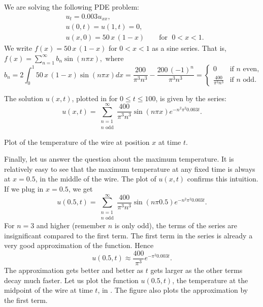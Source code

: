 \documentclass{ximera}
\begin{document}
\begin{exampleSol}
    We are solving the following PDE problem:
    \begin{align*}
        & u_t = 0.003 u_{xx} , \\
        & u(0,t) = u(1,t) = 0 , \\
        & u(x,0) = 50\,x\,(1-x) \qquad \text{for } \; 0 < x < 1 .
    \end{align*}
    We write $f(x) = 50\,x\,(1-x)$ for $0 < x < 1$ as a sine series.  That is, $f(x) = \sum_{n=1}^\infty b_n \sin (n \pi x) ,$ where
    \begin{equation*}
        b_n = 2 \int_0^1 50\,x\,(1-x) \sin (n \pi x)dx =  \frac{200}{{\pi }^{3}{n}^{3}}-\frac{200\,{\left( -1\right) }^{n}}{{\pi }^{3}{n}^{3}} =
        \begin{cases}
            0 & \text{if } n \text{ even} , \\
            \frac{400}{\pi^3 n^3} & \text{if } n \text{ odd} .
        \end{cases}
    \end{equation*}
    
    The solution $u(x,t)$, plotted in  for $0 \leq t \leq 100$, is given by the series:
    \begin{equation*}
        u(x,t) = \sum_{\substack{n=1 \\ 
        n \text{ odd}}}^\infty \frac{400}{\pi^3 n^3} \sin (n \pi x ) e^{-n^2 \pi^2 0.003 t} .
    \end{equation*}
    
    \begin{myfig}
        \capstart
        \caption{Plot of the temperature of the wire at position $x$ at time $t$.\label{heat:wireexfig}}
    \end{myfig}
    
    Finally, let us answer the question about the maximum temperature.  It is relatively easy to see that the maximum temperature at any fixed time is always at $x=0.5$, in the middle of the wire.  The plot of $u(x,t)$ confirms this intuition. If we plug in $x=0.5$, we get
    \begin{equation*}
        u(0.5,t) = \sum_{\substack{n=1 \\ 
        n \text{ odd}}}^\infty \frac{400}{\pi^3 n^3} \sin (n \pi0.5 ) e^{-n^2 \pi^2 0.003 t} .
    \end{equation*}
    For $n=3$ and higher (remember $n$ is only odd), the terms of the series are insignificant compared to the first term. The first term in the series is already a very good approximation of the function. Hence 
    \begin{equation*}
        u(0.5,t) \approx \frac{400}{\pi^3} e^{-\pi^2 0.003 t} .
    \end{equation*}
    The approximation gets better and better as $t$ gets larger as the other terms decay much faster. Let us plot the function $u(0.5,t)$, the temperature at the midpoint of the wire at time $t$, in .  The figure also plots the approximation by the first term.
    

\end{exampleSol}
\end{document}
